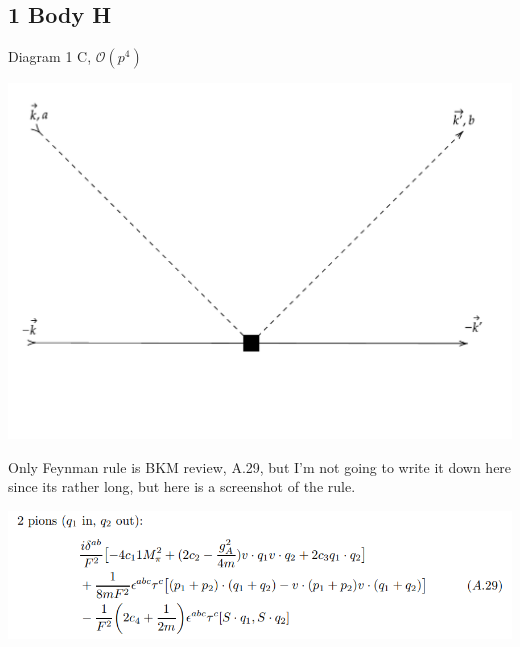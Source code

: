 \documentclass[11pt]{article}
\newcommand\mo{\mathcal{O}}
\begin{document}
\subsection{1 Body H}
Diagram 1 C, $\mo(p^4)$
\begin{center}
    \includegraphics[scale=0.6]{1h.pdf}
\end{center}
Only Feynman rule is BKM review, A.29, but I'm not going to write it down here since its rather long, but here is a screenshot of the rule.
\begin{center}
    \includegraphics[scale=0.6]{A29-rule.png}
\end{center}
\newpage

\end{document}
